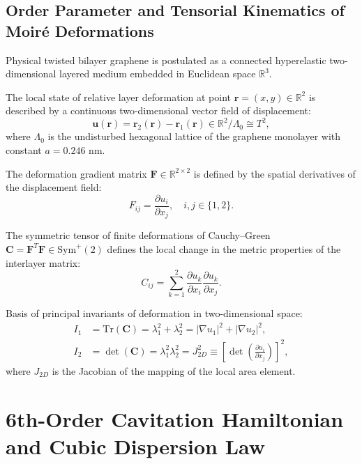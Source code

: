 \documentclass[12pt,a4paper]{article}
\begin{document}
	\subsection{Order Parameter and Tensorial Kinematics of Moiré Deformations}
	Physical twisted bilayer graphene is postulated as a connected hyperelastic two-dimensional layered medium embedded in Euclidean space $\mathbb{R}^3$. 
	
	The local state of relative layer deformation at point $\mathbf{r} = (x, y) \in \mathbb{R}^2$ is described by a continuous two-dimensional vector field of displacement:
	\begin{equation}
		\mathbf{u}(\mathbf{r}) = \mathbf{r}_2(\mathbf{r}) - \mathbf{r}_1(\mathbf{r}) \in \mathbb{R}^2 / \Lambda_0 \cong T^2,
	\end{equation}
	where $\Lambda_0$ is the undisturbed hexagonal lattice of the graphene monolayer with constant $a = 0.246\text{ nm}$.
	
	The deformation gradient matrix $\mathbf{F} \in \mathbb{R}^{2 \times 2}$ is defined by the spatial derivatives of the displacement field:
	\begin{equation}
		F_{ij} = \frac{\partial u_i}{\partial x_j}, \quad i, j \in \{1, 2\}.
	\end{equation}
	
	The symmetric tensor of finite deformations of Cauchy--Green $\mathbf{C} = \mathbf{F}^T \mathbf{F} \in \mathrm{Sym}^+(2)$ defines the local change in the metric properties of the interlayer matrix:
	\begin{equation}
		C_{ij} = \sum_{k=1}^2 \frac{\partial u_k}{\partial x_i} \frac{\partial u_k}{\partial x_j}.
	\end{equation}
	
	Basis of principal invariants of deformation in two-dimensional space:
	\begin{align}
		I_1 &= \mathrm{Tr}(\mathbf{C}) = \lambda_1^2 + \lambda_2^2 = |\nabla u_1|^2 + |\nabla u_2|^2, \\
		I_2 &= \det(\mathbf{C}) = \lambda_1^2 \lambda_2^2 = J_{2D}^2 \equiv \left[ \det\left(\frac{\partial u_i}{\partial x_j}\right) \right]^2,
	\end{align}
	where $J_{2D}$ is the Jacobian of the mapping of the local area element.
	
	\section{6th-Order Cavitation Hamiltonian and Cubic Dispersion Law}
	
\end{document}
